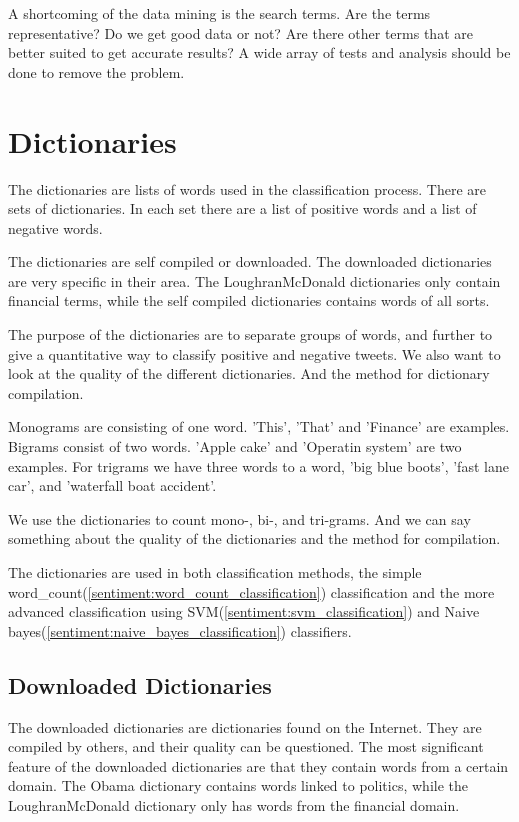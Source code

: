A shortcoming of the data mining is the search terms. Are the terms
representative? Do we get good data or not? Are there other terms that are
better suited to get accurate results? A wide array of tests and analysis should
be done to remove the problem. 
%

\section{Dictionaries}\label{data:dictionaries}

The dictionaries are lists of words used in the classification process. There
are sets of dictionaries. In each set there are a list of positive words and a list of negative words. 

The dictionaries are self compiled or downloaded. The downloaded dictionaries
are very specific in their area. The LoughranMcDonald dictionaries only contain
financial terms, while the self compiled dictionaries contains words of all
sorts. 

The purpose of the dictionaries are to separate groups of words, and
further to give a quantitative way to classify positive and negative tweets.
We also want to look at the quality of the different dictionaries. And the
method for dictionary compilation.  

Monograms are consisting of one word. 'This', 'That' and 'Finance' are
examples. Bigrams consist of two words. 'Apple cake' and
'Operatin system' are two examples. For trigrams we have three words to a word,
'big blue boots', 'fast lane car', and 'waterfall boat accident'. 

We use the dictionaries to count mono-, bi-, and tri-grams.
And we can say something about the quality of the dictionaries and the method
for compilation.

The dictionaries are used in both classification methods, the simple
word\_count(\ref{sentiment:word_count_classification}) classification and the
more advanced classification using SVM(\ref{sentiment:svm_classification}) and
Naive bayes(\ref{sentiment:naive_bayes_classification}) classifiers. 
%

\subsection{Downloaded Dictionaries}
The downloaded dictionaries are dictionaries found on the Internet. They are
compiled by others, and their quality can be questioned. The most significant
feature of the downloaded dictionaries are that they contain words from a
certain domain. The Obama dictionary contains words linked to politics,
while the LoughranMcDonald dictionary only has words from the financial domain.  

